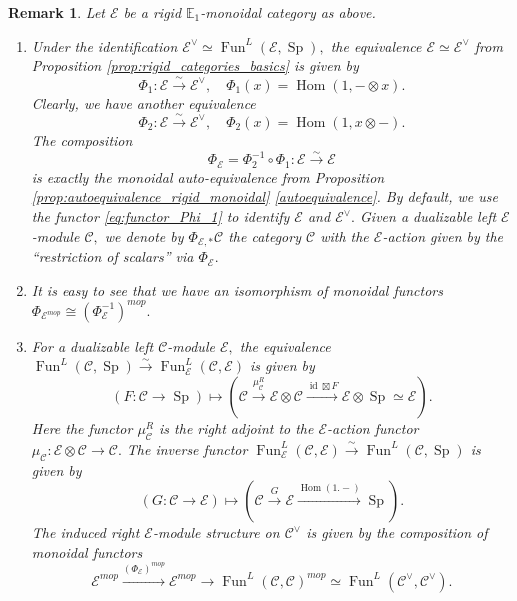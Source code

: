 \documentclass[11pt,leqno]{amsart}
\newtheorem{remark}[theo]{Remark}
\numberwithin{equation}{section}
\def\Hom{\operatorname{Hom}}
\newcommand{\xto}{\xrightarrow}
\newcommand{\bE}{{\mathbb E}}
\newcommand{\cC}{{\mathcal C}}
\newcommand{\cE}{{\mathcal E}}
\newcommand{\Fun}{\operatorname{Fun}}
\newcommand{\Sp}{\operatorname{Sp}}
\newcommand{\id}{\operatorname{id}}
\begin{document}
\begin{remark}\label{rem:relative_and_absolute_duality}
Let $\cE$ be a rigid $\bE_1$-monoidal category as above.
\begin{enumerate}[label=(\roman*),ref=(\roman*)]
\item Under the identification $\cE^{\vee}\simeq \Fun^L(\cE,\Sp),$ the equivalence $\cE\simeq \cE^{\vee}$ from Proposition \ref{prop:rigid_categories_basics}  is given by
\begin{equation}\label{eq:functor_Phi_1}
\Phi_1:\cE\xto{\sim}\cE^{\vee},\quad \Phi_1(x)=\Hom(1,-\otimes x).
\end{equation}
Clearly, we have another equivalence
\begin{equation*}
	\Phi_2:\cE\xto{\sim}\cE^{\vee},\quad \Phi_2(x)=\Hom(1,x\otimes -).
\end{equation*}
The composition 
\begin{equation*}
\Phi_{\cE}=\Phi_2^{-1}\circ\Phi_1:\cE\xto{\sim}\cE
\end{equation*} 
is exactly the monoidal auto-equivalence from Proposition \ref{prop:autoequivalence_rigid_monoidal} \ref{autoequivalence}. By default, we use the functor \eqref{eq:functor_Phi_1} to identify $\cE$ and $\cE^{\vee}.$ Given a dualizable left $\cE$-module $\cC,$ we denote by $\Phi_{\cE,*}\cC$ the category $\cC$ with the  $\cE$-action given by the ``restriction of scalars'' via $\Phi_{\cE}.$ \label{functor_Phi_E}
\item It is easy to see that we have an isomorphism of monoidal functors $\Phi_{\cE^{mop}}\cong (\Phi_{\cE}^{-1})^{mop}.$
\item For a dualizable left $\cC$-module $\cE,$ the equivalence $\Fun^L(\cC,\Sp)\xto{\sim}\Fun_{\cE}^L(\cC,\cE)$ is given by
\begin{equation*}
(F:\cC\to\Sp)\mapsto (\cC\xto{\mu_{\cC}^R}\cE\otimes\cC\xto{\id\boxtimes F}\cE\otimes\Sp\simeq \cE).
\end{equation*}
Here the functor $\mu_{\cC}^R$ is the right adjoint to the $\cE$-action functor $\mu_{\cC}:\cE\otimes\cC\to\cC.$
The inverse functor $\Fun_{\cE}^L(\cC,\cE)\xto{\sim}\Fun^L(\cC,\Sp)$ is given by
\begin{equation*}
(G:\cC\to\cE)\mapsto (\cC\xto{G}\cE\xto{\Hom(1.-)}\Sp).
\end{equation*}
The induced right $\cE$-module structure on $\cC^{\vee}$ is given by the composition of monoidal functors
\begin{equation*}
\cE^{mop}\xto{(\Phi_{\cE})^{mop}}\cE^{mop}\to\Fun^L(\cC,\cC)^{mop}\simeq \Fun^L(\cC^{\vee},\cC^{\vee}).

\end{equation*}
\end{enumerate}
\end{remark}
\end{document}
